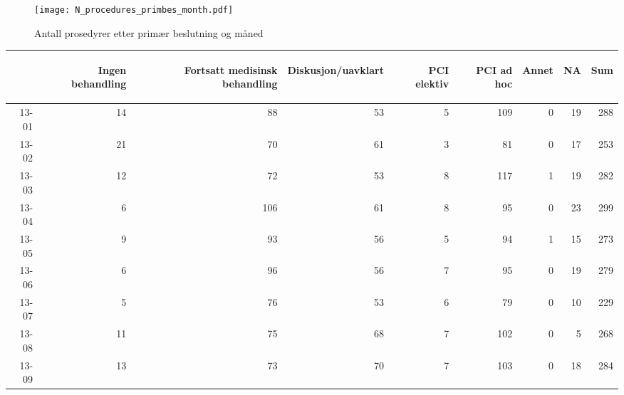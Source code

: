 \documentclass[presentation,xcolor=pdftex,dvipsnames,table]{beamer}
\begin{document}

\begin{frame}
\begin{figure}
  \centering
  \caption{Antall prosedyrer etter primær beslutning og måned}
\texttt{[image: N\_procedures\_primbes\_month.pdf]}
\end{figure}\end{frame}


\begin{frame}
\begin{tiny}
\begin{table}[ht]
\centering
\begin{tabular}{rrrrrrrrr}
  \toprule
 & \begin{sideways} Ingen behandling \end{sideways} & \begin{sideways} Fortsatt medisinsk behandling \end{sideways} & \begin{sideways} Diskusjon/uavklart \end{sideways} & \begin{sideways} PCI elektiv \end{sideways} & \begin{sideways} PCI ad hoc \end{sideways} & \begin{sideways} Annet \end{sideways} & \begin{sideways} NA \end{sideways} & \begin{sideways} Sum \end{sideways} \\ 
  \midrule
13-01 & 14 & 88 & 53 & 5 & 109 & 0 & 19 & 288 \\ 
  13-02 & 21 & 70 & 61 & 3 & 81 & 0 & 17 & 253 \\ 
  13-03 & 12 & 72 & 53 & 8 & 117 & 1 & 19 & 282 \\ 
  13-04 & 6 & 106 & 61 & 8 & 95 & 0 & 23 & 299 \\ 
  13-05 & 9 & 93 & 56 & 5 & 94 & 1 & 15 & 273 \\ 
  13-06 & 6 & 96 & 56 & 7 & 95 & 0 & 19 & 279 \\ 
  13-07 & 5 & 76 & 53 & 6 & 79 & 0 & 10 & 229 \\ 
  13-08 & 11 & 75 & 68 & 7 & 102 & 0 & 5 & 268 \\ 
  13-09 & 13 & 73 & 70 & 7 & 103 & 0 & 18 & 284 \\ 

\end{tabular}
\end{table}
\end{tiny}
\end{frame}
\end{document}
